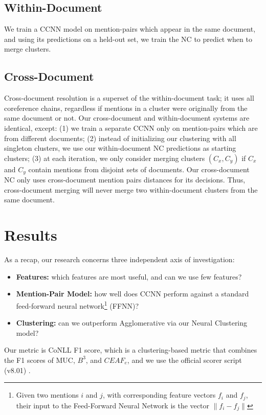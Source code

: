 \subsection{Within-Document}
We train a CCNN model on mention-pairs which appear in the same document, and using its predictions on a held-out set, we train the NC to predict when to merge clusters.

\subsection{Cross-Document}
Cross-document resolution is a superset of the within-document task; it uses all coreference chains, regardless if mentions in a cluster were originally from the same document or not.  Our cross-document and within-document systems are identical, except: (1) we train a separate CCNN only on mention-pairs which are from different documents; (2) instead of initializing our clustering with all singleton clusters, we use our within-document NC predictions as starting clusters; (3) at each iteration, we only consider merging clusters $(C_x,C_y)$ if $C_x$ and $C_y$ contain mentions from disjoint sets of documents.  Our cross-document NC only uses cross-document mention pairs distances for its decisions.  Thus, cross-document merging will never merge two within-document clusters from the same document.

\section{Results}
As a recap, our research concerns three independent axis of investigation:
\begin{itemize}
\item \textbf{Features:} which features are most useful, and can we use few features?
\item \textbf{Mention-Pair Model:} how well does CCNN perform against a standard feed-forward neural network\footnote{Given two mentions $i$ and $j$, with corresponding feature vectors $f_i$ and $f_j$, their input to the Feed-Forward Neural Network is the vector $\|f_{i} - f_{j}\|$} (FFNN)?
\item \textbf{Clustering:} can we outperform Agglomerative via our Neural Clustering model?
\end{itemize}

Our metric is CoNLL F1 score, which is a clustering-based metric that combines the F1 scores of MUC, $B^{3}$, and $CEAF_{e}$, and we use the official scorer script (v8.01) \cite{Pradhan+etal:14a}.

